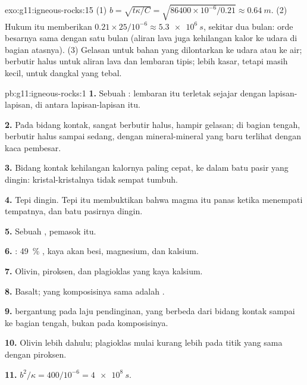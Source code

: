 \begin{solution}{exo:g11:igneous-rocks:15}
(1) $b = \sqrt{t\kappa/C} = \sqrt{86400 \times 10^{-6}/0.21} \approx
\qty{0.64}{m}$. (2) Hukum itu memberikan $0.21 \times 25/10^{-6} \approx
\qty{5.3e6}{s}$, sekitar dua bulan: orde besarnya sama dengan satu bulan
(aliran lava juga kehilangan kalor ke udara di bagian atasnya). (3) Gelasan
untuk bahan yang dilontarkan ke udara atau ke air; berbutir halus untuk aliran
lava dan lembaran tipis; lebih kasar, tetapi masih kecil, untuk  dangkal
yang tebal.
\end{solution}

\begin{solution}{pb:g11:igneous-rocks:1}
\textbf{1.} Sebuah : lembaran itu terletak sejajar dengan lapisan-lapisan,
di antara lapisan-lapisan itu.

\textbf{2.} Pada bidang kontak, sangat berbutir halus, hampir gelasan; di
bagian tengah, berbutir halus sampai sedang, dengan mineral-mineral yang baru
terlihat dengan kaca pembesar.

\textbf{3.} Bidang kontak kehilangan kalornya paling cepat, ke dalam batu pasir
yang dingin: kristal-kristalnya tidak sempat tumbuh.

\textbf{4.} Tepi dingin. Tepi itu membuktikan bahwa magma itu panas ketika
menempati tempatnya, dan batu pasirnya dingin.

\textbf{5.} Sebuah , pemasok  itu.

\textbf{6.} : \qty{49}{\percent} , kaya akan besi, magnesium, dan
kalsium.

\textbf{7.} Olivin, piroksen, dan plagioklas yang kaya kalsium.

\textbf{8.} Basalt;  yang komposisinya sama adalah .

\textbf{9.}  bergantung pada laju pendinginan, yang berbeda dari bidang
kontak sampai ke bagian tengah, bukan pada komposisinya.

\textbf{10.} Olivin lebih dahulu; plagioklas mulai kurang lebih pada titik yang
sama dengan piroksen.

\textbf{11.} $b^2/\kappa = 400/10^{-6} = \qty{4e8}{s}$.


\end{solution}

